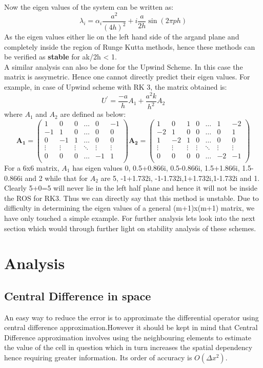 \documentclass[a4paper,12pt]{report}
\begin{document}
Now the eigen values of the system can be written as:
$$\lambda_i = \alpha_i\frac{a^2}{(4h)^2}+i\frac{a}{2h}\sin(2\pi ph)$$
As the eigen values either lie on the left hand side of the argand plane and completely inside the region of Runge Kutta methods, hence these methods can be verified as \textbf{stable} for ak/2h < 1.\\
A similar analysis can also be done for the Upwind Scheme. In this case the matrix is assymetric. Hence one cannot directly predict their eigen values. For example, in case of Upwind scheme with RK 3, the matrix obtained is:
\[U^{\prime}=\frac{-a}{h} A_1 + \frac{a^2 k}{h^2} A_2\]
where $A_1$ and $A_2$ are defined as below:
\[
\mathbf{A_1} = 
\begin{pmatrix}
1 & 0 & 0 & \ldots & 0 & -1 \\
-1& 1 & 0 & \ldots & 0 &  0 \\
0 & -1& 1 & \ldots & 0 &  0 \\
\vdots & \vdots & \vdots & \ddots & \vdots & \vdots \\ 
0 & 0 & 0 & \ldots & -1 & 1 \\
\end{pmatrix}
\mathbf{A_2} = 
\begin{pmatrix}
1 & 0 & 1 & 0 & \ldots & 1 & -2 \\
-2& 1 & 0 & 0 & \ldots & 0 & 1 \\
1 &-2 & 1 & 0 & \ldots & 0 & 0 \\
\vdots & \vdots & \vdots & \vdots & \ddots & \vdots & \vdots \\
0 & 0 & 0 & 0 & \ldots &-2 & -1 \\
\end{pmatrix}
\]
For a 6x6 matrix, $A_1$ has eigen values 0, 0.5+0.866i, 0.5-0.866i, 1.5+1.866i, 1.5-0.866i and 2 while that for $A_2$ are 5, -1+1.732i, -1-1.732i,1+1.732i,1-1.732i and 1. Clearly 5+0=5 will never lie in the left half plane and hence it will not be inside the ROS for RK3. Thus we can directly say that this method is unstable. Due to difficulty in determining the eigen values of a general (m+1)x(m+1) matrix, we have only touched a simple example. For further analysis lets look into the next section which would through further light on stability analysis of these schemes.
\chapter{Analysis}
\section{Central Difference in space}
An easy way to reduce the error is to approximate the differential operator using central difference approximation.However it should be kept in mind that Central Difference approximation involves using the neighbouring elements to estimate the value of the cell in question which in turn increases the spatial dependency hence requiring greater information. Its order of accuracy is $O(\Delta x^2)$.
\end{document}
